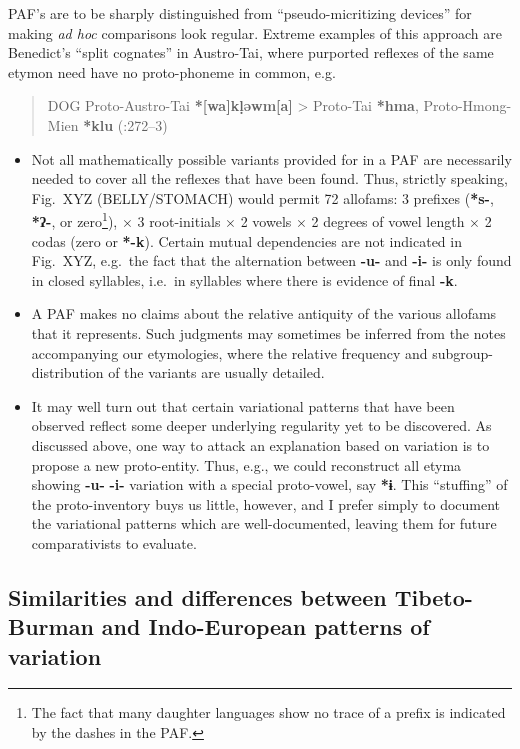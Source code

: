 PAF’s are to be sharply distinguished from “pseudo-micritizing devices” for making \textit{ad hoc} comparisons look regular. Extreme examples of this approach are Benedict’s “split cognates” in Austro-Tai, where purported reflexes of the same etymon need have no proto-phoneme in common, e.g.\ 
\begin{quote}
DOG \hfill Proto-Austro-Tai \textbf{*[wa]k\d{l}əwm[a]} > Proto-Tai \textbf{*hma}, Proto-Hmong-Mien \textbf{*klu} (\citealt{PKB-ATLC}:272–3)
\end{quote}

\begin{itemize}
\item Not all mathematically possible variants provided for in a PAF are necessarily needed to cover all the reflexes that have been found. Thus, strictly speaking, Fig.~XYZ (BELLY/STOMACH) would permit 72 allofams: 3 prefixes (\textbf{*s-}, \textbf{*ʔ-}, or zero\footnote{The fact that many daughter languages show no trace of a prefix is indicated by the dashes in the PAF.}), $\times$ 3 root-initials $\times$ 2 vowels $\times$ 2 degrees of vowel length $\times$ 2 codas (zero or \textbf{*-k}). Certain mutual dependencies are not indicated in Fig.~XYZ, e.g.\ the fact that the alternation between \textbf{-u-} and \textbf{-i-} is only found in closed syllables, i.e.\ in syllables where there is evidence of final \textbf{-k}.

\item A PAF makes no claims about the relative antiquity of the various allofams that it represents. Such judgments may sometimes be inferred from the notes accompanying our etymologies, where the relative frequency and subgroup-distribution of the variants are usually detailed.

\item It may well turn out that certain variational patterns that have been observed reflect some deeper underlying regularity yet to be discovered. As discussed above, one way to attack an explanation based on variation is to propose a new proto-entity. Thus, e.g., we could reconstruct all etyma showing \textbf{-u-}  \textbf{-i-} variation with a special proto-vowel, say \textbf{*ɨ}. This “stuffing” of the proto-inventory buys us little, however, and I prefer simply to document the variational patterns which are well-documented, leaving them for future comparativists to evaluate.
\end{itemize}

\subsection{Similarities and differences between Tibeto-Burman and Indo-European patterns of variation}

